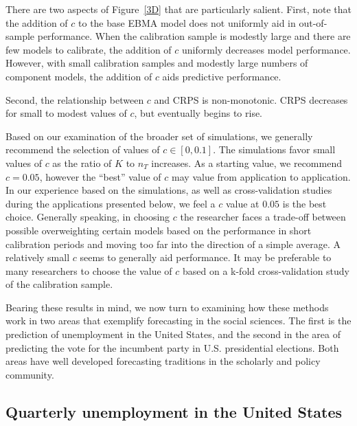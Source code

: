 \documentclass[12pt,fullpage,endnotes]{article}
\begin{document}
There are two aspects of Figure~\ref{3D} that are particularly
salient.  First, note that the addition of $c$ to the base EBMA model
does not uniformly aid in out-of-sample performance.  When the
calibration sample is modestly large and there are few
models to calibrate, the addition of $c$ uniformly decreases model
performance.  However, with small calibration samples and modestly
large numbers of component models, the addition of $c$ aids
predictive performance. 

Second, the relationship between $c$ and CRPS
is non-monotonic.  CRPS decreases for small to modest values of $c$,
but eventually begins to rise.

Based on our examination of the broader set of simulations, we generally recommend the selection of
values of $c \in [0, 0.1]$. The simulations favor small values of
$c$ as the ratio of $K$ to $n_T$ increases. As a starting value, we
recommend $c=0.05$, however the ``best'' value of $c$ may value from application to application. In our experience based on the simulations, as well as cross-validation studies during the applications presented below, we feel a $c$ value at $0.05$ is the best choice. Generally speaking, in choosing $c$ the researcher faces a trade-off between possible overweighting certain models based on the performance in short calibration periods and moving too far into the direction of a simple average. A relatively small $c$ seems to generally aid performance. It may be preferable to many researchers to choose the value of $c$
based on a k-fold cross-validation study of the calibration sample.

Bearing these results in mind, we now turn to examining how these
methods work in two areas that exemplify forecasting in the social
sciences. The first is the prediction of unemployment in the United
States, and the second in the area of predicting the vote for the
incumbent party in U.S. presidential elections. Both areas have well
developed forecasting traditions in the scholarly and policy
community.


\subsection{Quarterly unemployment in the United States}
\label{econ}
\end{document}
